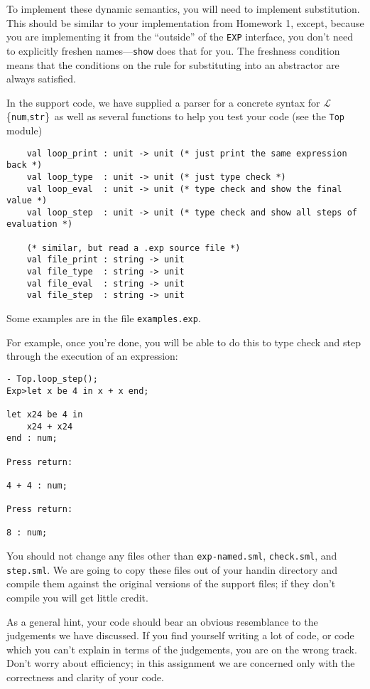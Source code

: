 \documentclass[11pt]{article}
\newcommand{\ttt}[1]{\texttt{#1}}
\newcommand{\EXP}[0]{$\mathcal{L}$\{\texttt{num},\texttt{str}\}}
\begin{document}
To implement these dynamic semantics, you will need to implement
substitution.  This should be similar to your implementation from
Homework 1, except, because you are implementing it from the ``outside''
of the \verb|EXP| interface, you don't need to explicitly freshen
names---\verb|show| does that for you.  The freshness condition means
that the conditions on the rule for substituting into an abstractor are
always satisfied.  

\bigskip

In the support code, we have supplied a parser for a concrete syntax for
\EXP\ as well as several functions to help you test your code (see the
\verb|Top| module)

\begin{verbatim}
    val loop_print : unit -> unit (* just print the same expression back *)
    val loop_type  : unit -> unit (* just type check *)
    val loop_eval  : unit -> unit (* type check and show the final value *)
    val loop_step  : unit -> unit (* type check and show all steps of evaluation *)

    (* similar, but read a .exp source file *)
    val file_print : string -> unit
    val file_type  : string -> unit
    val file_eval  : string -> unit
    val file_step  : string -> unit
\end{verbatim}
Some examples are in the file \verb|examples.exp|.  

For example, once you're done, you will be able to do this to type check
and step through the execution of an expression:
\begin{verbatim}
- Top.loop_step();
Exp>let x be 4 in x + x end;

let x24 be 4 in
    x24 + x24
end : num;

Press return:

4 + 4 : num;

Press return:

8 : num;
\end{verbatim}

You should not change any files other than \ttt{exp-named.sml},
\ttt{check.sml}, and \ttt{step.sml}. We are going to copy these files out
of your handin directory and compile them against the original
versions of the support files; if they don't compile you will get
little credit.

As a general hint, your code should bear an obvious resemblance to the
judgements we have discussed. If you find yourself writing a lot of
code, or code which you can't explain in terms of the judgements, you
are on the wrong track. Don't worry about efficiency; in this
assignment we are concerned only with the correctness and clarity of
your code.
\end{document}
